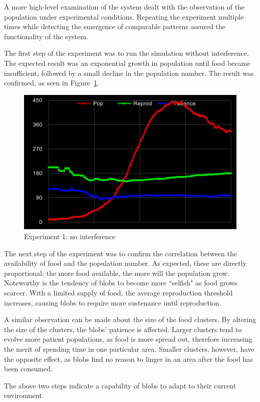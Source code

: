 A more high-level examination of the system dealt with the observation of the population under experimental conditions. Repeating the experiment multiple times while detecting the emergence of comparable patterns assured the functionality of the system.

The first step of the experiment was to run the simulation without interference. The expected result was an exponential growth in population until food became insufficient, followed by a small decline in the population number. The result was confirmed, as seen in Figure~\ref{fig:exp1}.

\begin{figure}[!th]
	\centering
	\includegraphics[scale=1.4]{images/exp1}
	\caption{\label{fig:exp1}Experiment 1: no interference}
\end{figure}

The next step of the experiment was to confirm the correlation between the availability of food and the population number. As expected, these are directly proportional; the more food available, the more will the population grow. Noteworthy is the tendency of blobs to become more ``selfish" as food grows scarcer. With a limited supply of food, the average reproduction threshold increases, causing blobs to require more sustenance until reproduction.

A similar observation can be made about the size of the food clusters. By altering the size of the clusters, the blobs' patience is affected. Larger clusters tend to evolve more patient populations, as food is more spread out, therefore increasing the merit of spending time in one particular area. Smaller clusters, however, have the opposite effect, as blobs find no reason to linger in an area after the food has been consumed.

The above two steps indicate a capability of blobs to adapt to their current environment.

